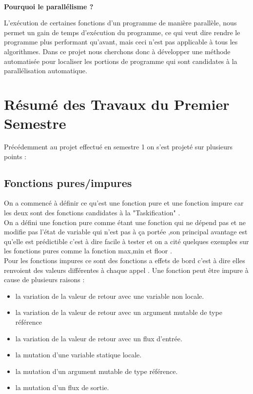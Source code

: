 \documentclass[12pt,a4paper]{article}
\begin{document}
\paragraph{}\textbf{Pourquoi le parallélisme ?}

 L’exécution de  certaines fonctions d'un programme de manière parallèle, nous permet un gain de temps d'exécution du programme, ce qui veut dire rendre le programme plus performant qu'avant, mais ceci n'est pas applicable à tous les algorithmes. Dans ce projet nous cherchons donc à développer une méthode automatisée pour localiser les portions de programme qui sont candidates à la parallélisation automatique.

\section{Résumé des Travaux du Premier Semestre}

Précédemment au projet effectué en semestre 1 on s'est projeté sur plusieurs points : 

\subsection{Fonctions pures/impures}
On a commencé à définir ce qu'est une fonction pure et une fonction impure car les deux sont des fonctions candidates à la "Taskification" .\\
On a défini une fonction pure comme étant une fonction qui ne dépend pas et ne modifie pas l'état de variable qui n'est pas à ça portée ,son principal avantage est qu'elle est prédictible c'est à dire facile à tester  et on a cité quelques exemples sur les fonctions pures comme la fonction max,min et floor .\\
Pour les fonctions impures ce sont des fonctions a effets de bord c'est à dire elles renvoient des valeurs différentes à chaque appel . Une fonction peut être impure à cause de plusieurs raisons :

    \begin{itemize}
    \item la variation de la valeur de retour avec une variable non locale.
    \item la variation de la valeur de retour avec un argument mutable de type référence
    \item la variation de la valeur de retour avec un flux d’entrée.
    \item la mutation d’une variable statique locale.
    \item la mutation d’un argument mutable de type référence.
    \item la mutation d’un flux de sortie.
\end{itemize}
\end{document}
